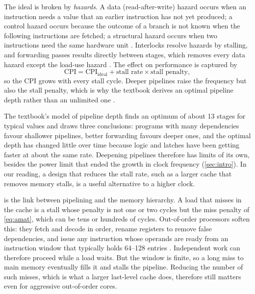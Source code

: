 The ideal is broken by \emph{hazards}. A data (read-after-write) hazard occurs when an instruction needs a value that an earlier instruction has not yet produced; a control hazard occurs because the outcome of a branch is not known when the following instructions are fetched; a structural hazard occurs when two instructions need the same hardware unit \cite[sec.~10.4]{sarangi2025basic}. Interlocks resolve hazards by stalling, and forwarding passes results directly between stages, which removes every data hazard except the load-use hazard \cite[sec.~10.12.1]{sarangi2025basic}. The effect on performance is captured by
\begin{equation}
  \mathrm{CPI} = \mathrm{CPI}_{\mathrm{ideal}} + \text{stall rate} \times \text{stall penalty},
  \label{eq:cpi-stalls}
\end{equation}
so the CPI grows with every stall cycle. Deeper pipelines raise the frequency but also the stall penalty, which is why the textbook derives an optimal pipeline depth rather than an unlimited one \cite[sec.~10.9.3]{sarangi2025basic}.

The textbook's model of pipeline depth \cite[sec.~10.9.3]{sarangi2025basic} finds an optimum of about 13 stages for typical values and draws three conclusions: programs with many dependencies favour shallower pipelines, better forwarding favours deeper ones, and the optimal depth has changed little over time because logic and latches have been getting faster at about the same rate. Deepening pipelines therefore has limits of its own, besides the power limit that ended the growth in clock frequency (\cref{sec:intro}). In our reading, a design that reduces the stall rate, such as a larger cache that removes memory stalls, is a useful alternative to a higher clock.

 is the link between pipelining and the memory hierarchy. A load that misses in the cache is a stall whose penalty is not one or two cycles but the miss penalty of \cref{eq:amat}, which can be tens or hundreds of cycles. Out-of-order processors soften this: they fetch and decode in order, rename registers to remove false dependencies, and issue any instruction whose operands are ready from an instruction window that typically holds 64--128 entries \cite[sec.~10.11.4]{sarangi2025basic}. Independent work can therefore proceed while a load waits. But the window is finite, so a long miss to main memory eventually fills it and stalls the pipeline. Reducing the number of such misses, which is what a larger last-level cache does, therefore still matters even for aggressive out-of-order cores.


